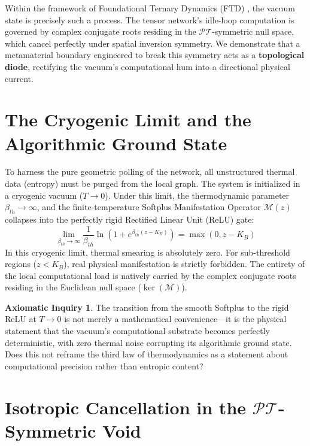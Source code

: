 \documentclass[11pt, letterpaper]{article}
\newcommand{\PT}{\mathcal{PT}}
\theoremstyle{definition}
\newtheorem{inquiry}{Axiomatic Inquiry}[section]
\theoremstyle{remark}
\begin{document}
Within the framework of Foundational Ternary Dynamics (FTD) \cite{Anon2026_Zenodo}, the vacuum state is precisely such a process. The tensor network's idle-loop computation is governed by complex conjugate roots residing in the $\PT$-symmetric null space, which cancel perfectly under spatial inversion symmetry. We demonstrate that a metamaterial boundary engineered to break this symmetry acts as a \textbf{topological diode}, rectifying the vacuum's computational hum into a directional physical current.

\section{The Cryogenic Limit and the Algorithmic Ground State}

To harness the pure geometric polling of the network, all unstructured thermal data (entropy) must be purged from the local graph. The system is initialized in a cryogenic vacuum ($T \to 0$). Under this limit, the thermodynamic parameter $\beta_{th} \to \infty$, and the finite-temperature Softplus Manifestation Operator $\mathcal{M}(z)$ collapses into the perfectly rigid Rectified Linear Unit (ReLU) gate:
\begin{equation}
    \lim_{\beta_{th} \to \infty} \frac{1}{\beta_{th}} \ln\left(1 + e^{\beta_{th} (z - K_B)}\right) = \max(0, z - K_B)
\end{equation}
In this cryogenic limit, thermal smearing is absolutely zero. For sub-threshold regions ($z < K_B$), real physical manifestation is strictly forbidden. The entirety of the local computational load is natively carried by the complex conjugate roots residing in the Euclidean null space ($\ker(\mathcal{M})$).

\begin{inquiry}
The transition from the smooth Softplus to the rigid ReLU at $T \to 0$ is not merely a mathematical convenience---it is the physical statement that the vacuum's computational substrate becomes perfectly deterministic, with zero thermal noise corrupting its algorithmic ground state. Does this not reframe the third law of thermodynamics as a statement about computational precision rather than entropic content?
\end{inquiry}

\section{Isotropic Cancellation in the $\PT$-Symmetric Void}
\end{document}
